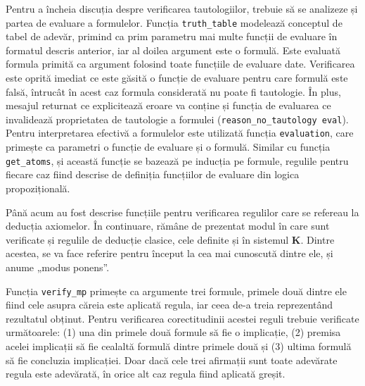 \documentclass[12pt, openany]{book}
\begin{document}
            \par{}
                Pentru a încheia discuția despre verificarea tautologiilor, trebuie să se analizeze și partea de 
                evaluare a formulelor. Funcția \texttt{truth\_table} modelează conceptul de tabel de adevăr, primind ca 
                prim parametru mai multe funcții de evaluare în formatul descris anterior, iar al doilea argument este o 
                formulă. Este evaluată formula primită ca argument folosind toate funcțiile de evaluare date. 
                Verificarea este oprită imediat ce este găsită o funcție de evaluare pentru care formulă este falsă, 
                întrucât în acest caz formula considerată nu poate fi tautologie. În plus, mesajul returnat ce 
                explicitează eroare va conține și funcția de evaluarea ce invalidează proprietatea de tautologie a 
                formulei (\texttt{reason\_no\_tautology eval}). Pentru interpretarea efectivă a formulelor este 
                utilizată funcția \texttt{evaluation}, care primește ca parametri o funcție de evaluare și o formulă. 
                Similar cu funcția \texttt{get\_atoms}, și această funcție se bazează pe inducția pe formule, regulile 
                pentru fiecare caz fiind descrise de definiția funcțiilor de evaluare din logica propozițională.
            
            \par{}
                Până acum au fost descrise funcțiile pentru verificarea regulilor care se refereau la deducția 
                axiomelor. În continuare, rămâne de prezentat modul în care sunt verificate și 
                regulile de deducție clasice, cele definite și în sistemul \textbf{K}. Dintre acestea, se va face 
                referire pentru început la cea mai cunoscută dintre ele, și anume „modus ponens”. 

            \par{}
                Funcția \texttt{verify\_mp} primește ca argumente trei formule, primele două dintre ele fiind cele 
                asupra căreia este aplicată regula, iar ceea de-a treia reprezentând rezultatul obținut. Pentru 
                verificarea corectitudinii acestei reguli trebuie verificate următoarele: (1) una din primele două 
                formule să fie o implicație, (2) premisa acelei implicații să fie cealaltă formulă dintre primele două 
                și (3) ultima formulă să fie concluzia implicației. Doar dacă cele trei afirmații sunt toate adevărate 
                regula este adevărată, în orice alt caz regula fiind aplicată greșit.
\end{document}
